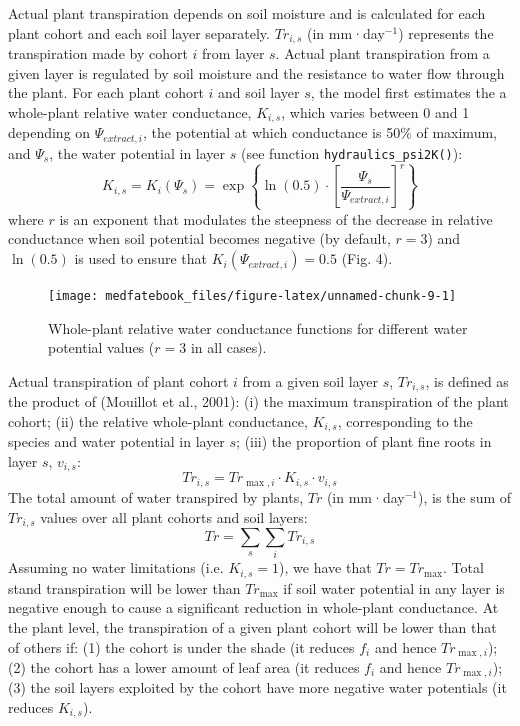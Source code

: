 \documentclass[]{book}
\begin{document}
Actual plant transpiration depends on soil moisture and is calculated for each plant cohort and each soil layer separately. \(Tr_{i,s}\) (in mm·day\(^{-1}\)) represents the transpiration made by cohort \(i\) from layer \(s\). Actual plant transpiration from a given layer is regulated by soil moisture and the resistance to water flow through the plant. For each plant cohort \(i\) and soil layer \(s\), the model first estimates the a whole-plant relative water conductance, \(K_{i,s}\), which varies between 0 and 1 depending on \(\Psi_{extract,i}\), the potential at which conductance is 50\% of maximum, and \(\Psi_s\), the water potential in layer \(s\) (see function \texttt{hydraulics\_psi2K()}):
\begin{equation}
K_{i,s}=K_{i}(\Psi_s) = \exp \left \{\ln{(0.5)}\cdot \left[ \frac{\Psi_s}{\Psi_{extract,i}} \right] ^r \right \} 
\end{equation}
where \(r\) is an exponent that modulates the steepness of the decrease in relative
conductance when soil potential becomes negative (by default, \(r = 3\)) and \(\ln(0.5)\)
is used to ensure that \(K_{i}(\Psi_{extract,i}) = 0.5\) (Fig. 4).

\begin{figure}

{\centering \texttt{[image: medfatebook\_files/figure-latex/unnamed-chunk-9-1]} 

}

\caption{Whole-plant relative water conductance functions for different water potential values ($r = 3$ in all cases).}\label{fig:unnamed-chunk-9}
\end{figure}

Actual transpiration of plant cohort \(i\) from a given soil layer \(s\), \(Tr_{i,s}\),
is defined as the product of (Mouillot et al., 2001): (i) the maximum transpiration
of the plant cohort; (ii) the relative whole-plant conductance, \(K_{i,s}\),
corresponding to the species and water potential in layer \(s\); (iii) the
proportion of plant fine roots in layer \(s\), \(v_{i,s}\):
\begin{equation}
Tr_{i,s} =  Tr_{\max,i} \cdot K_{i,s} \cdot v_{i,s}
\end{equation}
The total amount of water transpired by plants, \(Tr\) (in mm·day\(^{-1}\)), is the sum of
\(Tr_{i,s}\) values over all plant cohorts and soil layers:
\begin{equation}
Tr =\sum_{s}\sum_{i}{Tr_{i,s}}
\end{equation}
Assuming no water limitations (i.e. \(K_{i,s} = 1\)), we have that \(Tr = Tr_{\max}\).
Total stand transpiration will be lower than \(Tr_{\max}\) if soil water potential
in any layer is negative enough to cause a significant reduction in whole-plant
conductance. At the plant level, the transpiration of a given plant cohort will
be lower than that of others if: (1) the cohort is under the shade (it reduces
\(f_i\) and hence \(Tr_{\max,i}\)); (2) the cohort has a lower amount of leaf area
(it reduces \(f_i\) and hence \(Tr_{\max,i}\)); (3) the soil layers exploited by the
cohort have more negative water potentials (it reduces \(K_{i,s}\)).
\end{document}
